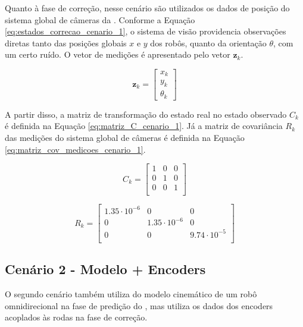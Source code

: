\documentclass[acronym, symbols, table, deposito]{fei}
\begin{document}
			 Quanto à fase de correção, nesse cenário são utilizados os dados de posição do sistema global de câmeras da . Conforme a Equação \eqref{eq:estados_correcao_cenario_1}, o sistema de visão providencia observações diretas tanto das posições globais $x$ e $y$ dos robôs, quanto da orientação $\theta$, com um certo ruído. O vetor de medições é apresentado pelo vetor $\textbf{z}_k$.
			 
	 		\begin{equation}\label{eq:estados_correcao_cenario_1}
			 	\textbf{z}_k  = 
			 	\begin{bmatrix}
			 		x_k \\
			 		y_k \\
			 		\theta_k
			 	\end{bmatrix}
			\end{equation}
		 
		 	A partir disso, a matriz de transformação do estado real no estado observado $C_k$ é definida na Equação \eqref{eq:matriz_C_cenario_1}. Já a matriz de covariância $R_{k}$ das medições do sistema global de câmeras é definida na Equação \eqref{eq:matriz_cov_medicoes_cenario_1}.
			 
			\begin{equation}\label{eq:matriz_C_cenario_1}
			 	C_{k} = \begin{bmatrix}
			 		1 & 0 & 0 \\
			 		0 & 1 & 0 \\
			 		0 & 0 & 1 \\
			 	\end{bmatrix}
		 	\end{equation}
	 	
	 		\begin{equation} \label{eq:matriz_cov_medicoes_cenario_1}
	 			R_{k} = \begin{bmatrix}
	 				1.35\cdot10^{-6} & 0 & 0 \\
	 				0 & 1.35\cdot10^{-6} & 0 \\
	 				0 & 0 & 9.74\cdot10^{-5} \\
	 			\end{bmatrix}
	 		\end{equation}
		
		\subsection{Cenário 2 - Modelo + Encoders} \label{sec:implementacao_cenario_2}
		
			O segundo cenário também utiliza do modelo cinemático de um robô omnidirecional na fase de predição do , mas utiliza os dados dos encoders acoplados às rodas na fase de correção.
			
\end{document}
